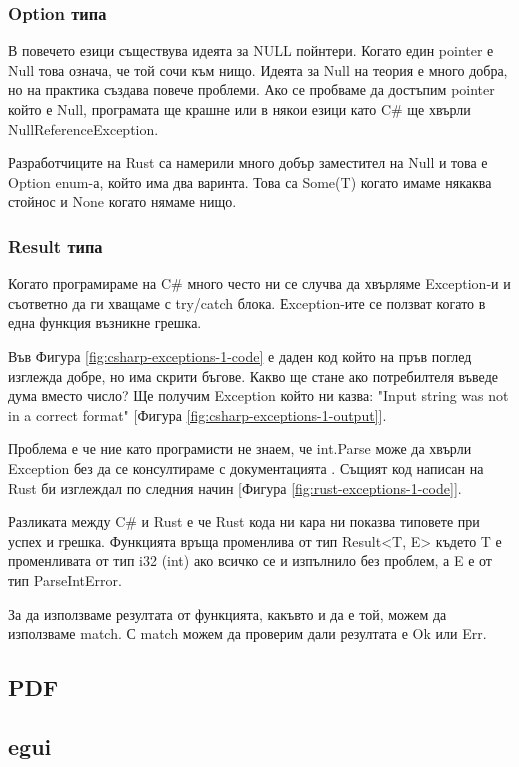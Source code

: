 \subsubsection{Option типа}
В повечето езици съществува идеята за NULL пойнтери. Когато един pointer е Null
това означа, че той сочи към нищо. Идеята за Null на теория е много добра, но
на практика създава повече проблеми. Ако се пробваме да достъпим pointer който
е Null, програмата ще крашне или в някои езици като C\# ще хвърли
NullReferenceException.

Разработчиците на Rust са намерили много добър заместител на Null и това е
Option enum-а, който има два варинта. Това са Some(T) когато имаме някаква
стойнос и None когато нямаме нищо.

\subsubsection{Result типа}
Когато програмираме на C\# много често ни се случва да хвърляме Exception-и и
съответно да ги хващаме с try/catch блока. Еxception-ите се ползват когато в
една функция възникне грешка.

Във Фигура \ref{fig:csharp-exceptions-1-code} е даден код който на пръв поглед
изглежда добре, но има скрити бъгове. Какво ще стане ако потребилтеля въведе
дума вместо число? Ще получим Exception който ни казва: "Input string was not
in a correct format" [Фигура \ref{fig:csharp-exceptions-1-output}].

Проблема е че ние като програмисти не знаем, че int.Parse може да хвърли
Exception без да се консултираме с документацията \cite{CSharp_Int_Parse}.
Същият код написан на Rust би изглеждал по следния начин [Фигура \ref{fig:rust-exceptions-1-code}].

Разликата между C\# и Rust е че Rust кода ни кара ни показва типовете при успех
и грешка. Функцията връща променлива от тип Result<T, E> където T е
променливата от тип i32 (int) ако всичко се и изпълнило без проблем, а E е от
тип ParseIntError.

За да използваме резултата от функцията, какъвто и да е той, можем да
използваме match. С match можем да проверим дали резултата е Ok или Err.



\subsection{PDF}
\subsection{egui}
